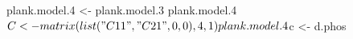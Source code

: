 \begin{Schunk}
\begin{Sinput}
 plank.model.4 <- plank.model.3
 plank.model.4$C <- matrix(list("C11", "C21", 0, 0), 4, 1)
 plank.model.4$c <- d.phos
\end{Sinput}
\end{Schunk}
